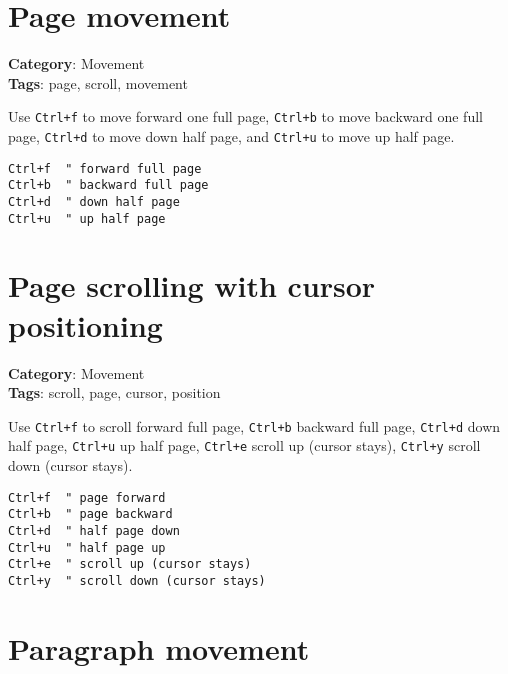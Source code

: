 {{{{{{{{\section{Page movement}

\textbf{Category}: Movement\\ \textbf{Tags}: page, scroll, movement
\vspace{0.5cm}

Use {\footnotesize \Verb§Ctrl+f§} to move forward one full page, {\footnotesize \Verb§Ctrl+b§} to move backward one full page, {\footnotesize \Verb§Ctrl+d§} to move down half page, and {\footnotesize \Verb§Ctrl+u§} to move up half page.

\begin{Exa*}{}
\begin{Verbatim}[fontsize=\footnotesize, breaklines, breakanywhere]
Ctrl+f  " forward full page
Ctrl+b  " backward full page
Ctrl+d  " down half page
Ctrl+u  " up half page
\end{Verbatim}
\end{Exa*}

\section{Page scrolling with cursor positioning}

\textbf{Category}: Movement\\ \textbf{Tags}: scroll, page, cursor, position
\vspace{0.5cm}

Use {\footnotesize \Verb§Ctrl+f§} to scroll forward full page, {\footnotesize \Verb§Ctrl+b§} backward full page, {\footnotesize \Verb§Ctrl+d§} down half page, {\footnotesize \Verb§Ctrl+u§} up half page, {\footnotesize \Verb§Ctrl+e§} scroll up (cursor stays), {\footnotesize \Verb§Ctrl+y§} scroll down (cursor stays).

\begin{Exa*}{}
\begin{Verbatim}[fontsize=\footnotesize, breaklines, breakanywhere]
Ctrl+f  " page forward
Ctrl+b  " page backward  
Ctrl+d  " half page down
Ctrl+u  " half page up
Ctrl+e  " scroll up (cursor stays)
Ctrl+y  " scroll down (cursor stays)
\end{Verbatim}
\end{Exa*}

\section{Paragraph movement}

}}}}}}}}
